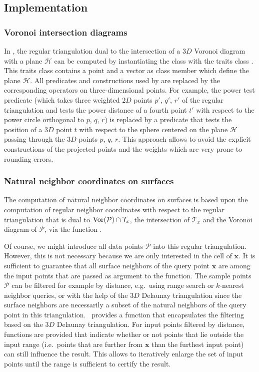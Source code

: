 \subsection{Implementation}
\subsubsection{Voronoi intersection diagrams}

In \cgal, the regular triangulation dual to the intersection of a $3D$
Voronoi diagram with a plane $\mathcal{H}$ can be computed by
instantiating the  class with
the traits class . This traits
class contains a point and a vector as class member which define the
plane $\mathcal{H}$. All predicates and constructions used by
 are replaced by the
corresponding operators on three-dimensional points. For example, the
power test predicate (which takes three weighted $2D$ points
$p'$, $q'$, $r'$ of the regular triangulation and tests the power
distance of a fourth point $t'$ with respect to the power circle orthogonal
to $p$, $q$, $r$) is replaced by a
 predicate that tests the
position of a $3D$ point $t$ with respect to the sphere centered on
the plane $\mathcal{H}$ passing through the $3D$ points $p$, $q$, $r$.
This approach allows to avoid the explicit constructions of the
projected points and the weights which are very prone to rounding
errors.

\subsubsection{Natural neighbor coordinates on surfaces}

The computation of natural neighbor coordinates on surfaces is based
upon the computation of regular neighbor coordinates with respect to
the regular triangulation that is dual to ${\rm Vor}(\mathcal{P}) \cap
\mathcal{T}_x$, the intersection of $\mathcal{T}_x$ and the Voronoi
diagram of $\mathcal{P}$, via the function
.

Of course, we might introduce all data points $\mathcal{P}$ into this
regular triangulation. However, this is not necessary because we are
only interested in the cell of $\mathbf{x}$. It is sufficient to
guarantee that all surface neighbors of the query point $\mathbf{x}$
are among the input points that are passed as argument to the
function. The sample points $\mathcal{P}$ can be filtered for example
by distance, e.g.\ using range search or $k$-nearest neighbor queries,
or with the help of the $3D$ Delaunay triangulation since the surface
neighbors are necessarily a subset of the natural neighbors of the
query point in this triangulation. \cgal\ provides a function that
encapsulates the filtering based on the $3D$ Delaunay triangulation.
For input points filtered by distance, functions are provided that
indicate whether or not points that lie outside the input range (i.e.\ 
points that are further from $\mathbf{x}$ than the furthest input
point) can still influence the result.  This allows to iteratively
enlarge the set of input points until the range is sufficient to
certify the result.

